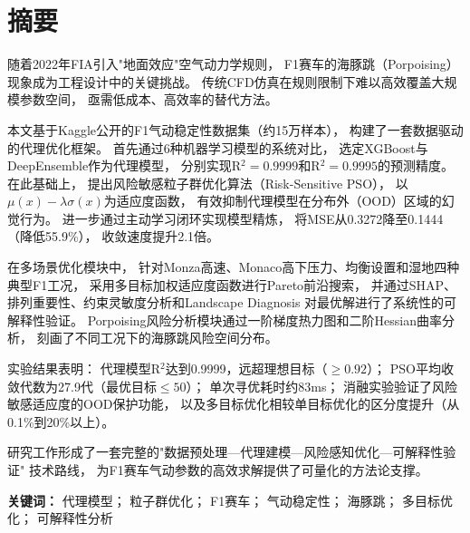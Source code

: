 \section*{摘要}

随着2022年FIA引入"地面效应"空气动力学规则，
F1赛车的海豚跳（Porpoising）现象成为工程设计中的关键挑战。
传统CFD仿真在规则限制下难以高效覆盖大规模参数空间，
亟需低成本、高效率的替代方法。

本文基于Kaggle公开的F1气动稳定性数据集（约15万样本），
构建了一套数据驱动的代理优化框架。
首先通过6种机器学习模型的系统对比，
选定XGBoost与DeepEnsemble作为代理模型，
分别实现R$^2 = 0.9999$和R$^2 = 0.9995$的预测精度。
在此基础上，
提出风险敏感粒子群优化算法（Risk-Sensitive PSO），
以$\mu(x)-\lambda\sigma(x)$为适应度函数，
有效抑制代理模型在分布外（OOD）区域的幻觉行为。
进一步通过主动学习闭环实现模型精炼，
将MSE从0.3272降至0.1444（降低55.9\%），
收敛速度提升2.1倍。

在多场景优化模块中，
针对Monza高速、Monaco高下压力、均衡设置和湿地四种典型F1工况，
采用多目标加权适应度函数进行Pareto前沿搜索，
并通过SHAP、排列重要性、约束灵敏度分析和Landscape Diagnosis
对最优解进行了系统性的可解释性验证。
Porpoising风险分析模块通过一阶梯度热力图和二阶Hessian曲率分析，
刻画了不同工况下的海豚跳风险空间分布。

实验结果表明：
代理模型R$^2$达到0.9999，远超理想目标（$\geq 0.92$）；
PSO平均收敛代数为27.9代（最优目标$\leq 50$）；
单次寻优耗时约83ms；
消融实验验证了风险敏感适应度的OOD保护功能，
以及多目标优化相较单目标优化的区分度提升（从0.1\%到20\%以上）。

研究工作形成了一套完整的"数据预处理—代理建模—风险感知优化—可解释性验证"
技术路线，
为F1赛车气动参数的高效求解提供了可量化的方法论支撑。

\vspace{0.5cm}

\noindent
\textbf{关键词：}
代理模型；
粒子群优化；
F1赛车；
气动稳定性；
海豚跳；
多目标优化；
可解释性分析
